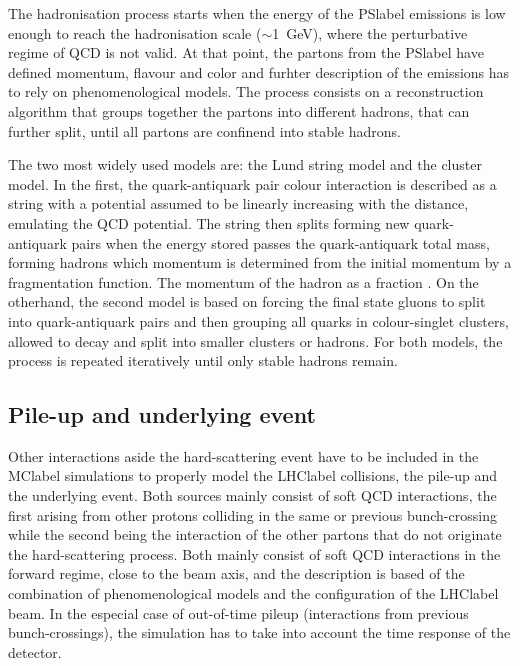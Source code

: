 The hadronisation process starts when the energy of the \acrshort{PSlabel} emissions is low enough to reach the hadronisation scale ($\sim$1~GeV), where the perturbative regime of \acrshort{QCD} is not valid. At that point, the partons from the \acrshort{PSlabel} have defined momentum, flavour and color and furhter description of the emissions has to rely on phenomenological models. The process consists on a reconstruction algorithm that groups together the partons into different hadrons, that can further split, until all partons are confinend into stable hadrons. 

The two most widely used models are: the Lund string model %
and the cluster model. %
In the first, the quark-antiquark pair colour interaction is described as a string with a potential assumed to be linearly increasing with the distance, emulating the \acrshort{QCD} potential. The string then splits forming new quark-antiquark pairs when the energy stored passes the quark-antiquark total mass, forming hadrons which momentum is determined from the initial momentum by a fragmentation function. The momentum of the hadron as a fraction . On the otherhand, the second model is based on forcing the final state gluons to split into quark-antiquark pairs and then grouping all quarks in colour-singlet clusters, allowed to decay and split into smaller clusters or hadrons. For both models, the process is repeated iteratively until only stable hadrons remain.

\subsection{Pile-up and underlying event}

Other interactions aside the hard-scattering event have to be included in the \acrshort{MClabel} simulations to properly model the \acrshort{LHClabel} collisions, the pile-up and the underlying event. Both sources mainly consist of soft \acrshort{QCD} interactions, the first arising from other protons colliding in the same or previous bunch-crossing while the second being the interaction of the other partons that do not originate the hard-scattering process. Both mainly consist of soft \acrshort{QCD} interactions in the forward regime, close to the beam axis, and the description is based of the combination of phenomenological models and the configuration of the \acrshort{LHClabel} beam. In the especial case of out-of-time pileup (interactions from previous bunch-crossings), the simulation has to take into account the time response of the detector.

